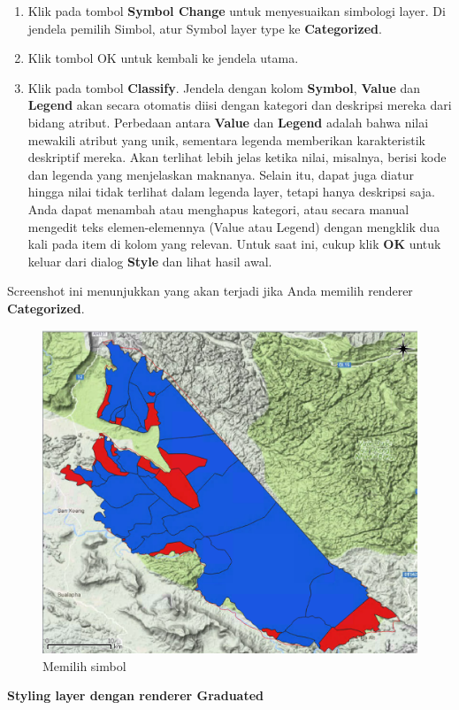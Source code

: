 \documentclass[]{book}
\begin{document}
\begin{enumerate}
\def\labelenumi{\arabic{enumi}.}
\item
  Klik pada tombol \textbf{Symbol Change} untuk menyesuaikan simbologi layer. Di jendela pemilih Simbol, atur Symbol layer type ke \textbf{Categorized}.
\item
  Klik tombol OK untuk kembali ke jendela utama.
\item
  Klik pada tombol \textbf{Classify}. Jendela dengan kolom \textbf{Symbol}, \textbf{Value} dan \textbf{Legend} akan secara otomatis diisi dengan kategori dan deskripsi mereka dari bidang atribut. Perbedaan antara \textbf{Value} dan \textbf{Legend} adalah bahwa nilai mewakili atribut yang unik, sementara legenda memberikan karakteristik deskriptif mereka. Akan terlihat lebih jelas ketika nilai, misalnya, berisi kode dan legenda yang menjelaskan maknanya. Selain itu, dapat juga diatur hingga nilai tidak terlihat dalam legenda layer, tetapi hanya deskripsi saja. Anda dapat menambah atau menghapus kategori, atau secara manual mengedit teks elemen-elemennya (Value atau Legend) dengan mengklik dua kali pada item di kolom yang relevan. Untuk saat ini, cukup klik \textbf{OK} untuk keluar dari dialog \textbf{Style} dan lihat hasil awal.
\end{enumerate}

Screenshot ini menunjukkan yang akan terjadi jika Anda memilih renderer \textbf{Categorized}.

\begin{figure}

{\centering \includegraphics[width=0.6\linewidth]{images/09/fig96} 

}

\caption{Memilih simbol}\label{fig:fig96}
\end{figure}

\textbf{Styling layer dengan renderer Graduated}
\end{document}
